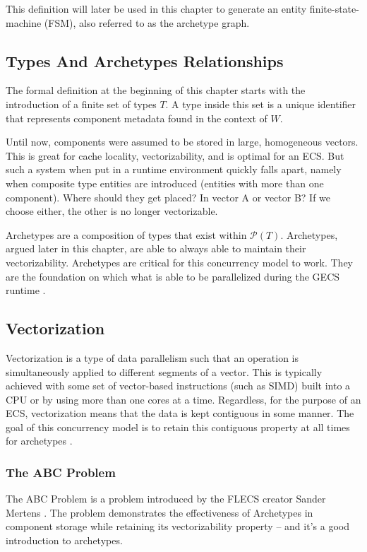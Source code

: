 This definition will later be used in this chapter to generate an entity finite-state-machine (FSM), also referred to as the archetype graph.

\subsection{Types And Archetypes Relationships}
The formal definition at the beginning of this chapter starts with the introduction of a finite set of types $T$. A type inside this set is a unique identifier that represents component metadata found in the context of $W$.

Until now, components were assumed to be stored in large, homogeneous vectors. This is great for cache locality, vectorizability, and is optimal for an ECS. But such a system when put in a runtime environment quickly falls apart, namely when composite type entities are introduced (entities with more than one component). Where should they get placed? In vector A or vector B? If we choose either, the other is no longer vectorizable. 

Archetypes are a composition of types that exist within $\mathcal{P}(T)$. Archetypes, argued later in this chapter, are able to always able to maintain their vectorizability. Archetypes are critical for this concurrency model to work. They are the foundation on which what is able to be parallelized during the GECS runtime \cite{SanderMertensECS}.

\subsection{Vectorization}
Vectorization is a type of data parallelism such that an operation is simultaneously applied to different segments of a vector. This is typically achieved with some set of vector-based instructions (such as SIMD) built into a CPU or by using more than one cores at a time. Regardless, for the purpose of an ECS, vectorization means that the data is kept contiguous in some manner. The goal of this concurrency model is to retain this contiguous property at all times for archetypes \cite{vectorization_wolfe_michael}.

\subsubsection{The ABC Problem}


The ABC Problem is a problem introduced by the FLECS creator Sander Mertens \cite{SanderMertensECS}. The problem demonstrates the effectiveness of Archetypes in component storage while retaining its vectorizability property -- and it's a good introduction to archetypes.

